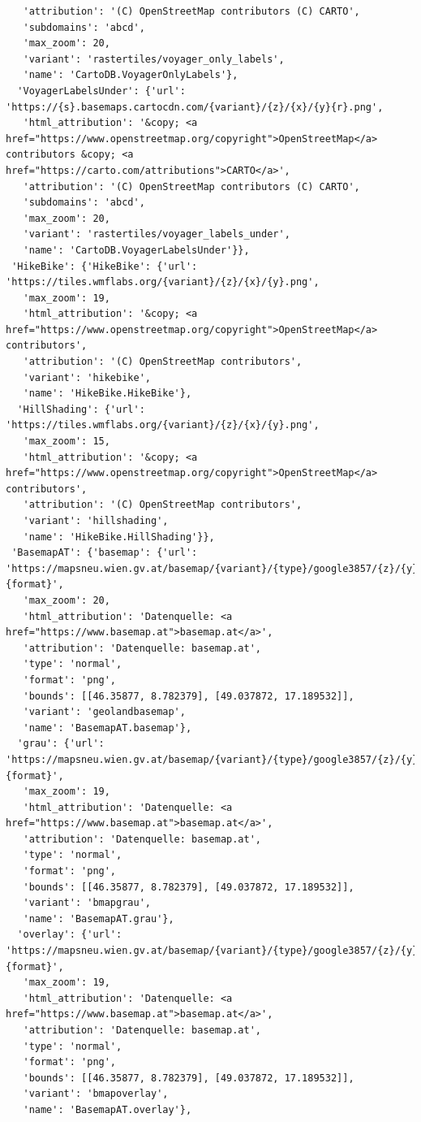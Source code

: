 \documentclass[
  letterpaper,
  DIV=11,
  numbers=noendperiod]{scrreprt}
\begin{document}
\begin{verbatim}
   'attribution': '(C) OpenStreetMap contributors (C) CARTO',
   'subdomains': 'abcd',
   'max_zoom': 20,
   'variant': 'rastertiles/voyager_only_labels',
   'name': 'CartoDB.VoyagerOnlyLabels'},
  'VoyagerLabelsUnder': {'url': 'https://{s}.basemaps.cartocdn.com/{variant}/{z}/{x}/{y}{r}.png',
   'html_attribution': '&copy; <a href="https://www.openstreetmap.org/copyright">OpenStreetMap</a> contributors &copy; <a href="https://carto.com/attributions">CARTO</a>',
   'attribution': '(C) OpenStreetMap contributors (C) CARTO',
   'subdomains': 'abcd',
   'max_zoom': 20,
   'variant': 'rastertiles/voyager_labels_under',
   'name': 'CartoDB.VoyagerLabelsUnder'}},
 'HikeBike': {'HikeBike': {'url': 'https://tiles.wmflabs.org/{variant}/{z}/{x}/{y}.png',
   'max_zoom': 19,
   'html_attribution': '&copy; <a href="https://www.openstreetmap.org/copyright">OpenStreetMap</a> contributors',
   'attribution': '(C) OpenStreetMap contributors',
   'variant': 'hikebike',
   'name': 'HikeBike.HikeBike'},
  'HillShading': {'url': 'https://tiles.wmflabs.org/{variant}/{z}/{x}/{y}.png',
   'max_zoom': 15,
   'html_attribution': '&copy; <a href="https://www.openstreetmap.org/copyright">OpenStreetMap</a> contributors',
   'attribution': '(C) OpenStreetMap contributors',
   'variant': 'hillshading',
   'name': 'HikeBike.HillShading'}},
 'BasemapAT': {'basemap': {'url': 'https://mapsneu.wien.gv.at/basemap/{variant}/{type}/google3857/{z}/{y}/{x}.{format}',
   'max_zoom': 20,
   'html_attribution': 'Datenquelle: <a href="https://www.basemap.at">basemap.at</a>',
   'attribution': 'Datenquelle: basemap.at',
   'type': 'normal',
   'format': 'png',
   'bounds': [[46.35877, 8.782379], [49.037872, 17.189532]],
   'variant': 'geolandbasemap',
   'name': 'BasemapAT.basemap'},
  'grau': {'url': 'https://mapsneu.wien.gv.at/basemap/{variant}/{type}/google3857/{z}/{y}/{x}.{format}',
   'max_zoom': 19,
   'html_attribution': 'Datenquelle: <a href="https://www.basemap.at">basemap.at</a>',
   'attribution': 'Datenquelle: basemap.at',
   'type': 'normal',
   'format': 'png',
   'bounds': [[46.35877, 8.782379], [49.037872, 17.189532]],
   'variant': 'bmapgrau',
   'name': 'BasemapAT.grau'},
  'overlay': {'url': 'https://mapsneu.wien.gv.at/basemap/{variant}/{type}/google3857/{z}/{y}/{x}.{format}',
   'max_zoom': 19,
   'html_attribution': 'Datenquelle: <a href="https://www.basemap.at">basemap.at</a>',
   'attribution': 'Datenquelle: basemap.at',
   'type': 'normal',
   'format': 'png',
   'bounds': [[46.35877, 8.782379], [49.037872, 17.189532]],
   'variant': 'bmapoverlay',
   'name': 'BasemapAT.overlay'},

\end{verbatim}
\end{document}
